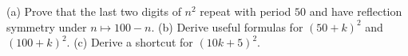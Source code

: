 (a) Prove that the last two digits of $n^2$ repeat with period $50$ and have reflection symmetry under $n\mapsto100-n$. (b) Derive useful formulas for $(50+k)^2$ and $(100+k)^2$. (c) Derive a shortcut for $(10k+5)^2$.

